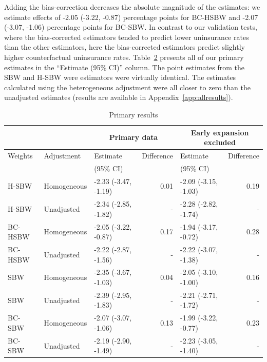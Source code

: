 \documentclass[aoas]{imsart}
\theoremstyle{plain}
\theoremstyle{remark}
\begin{document}
Adding the bias-correction decreases the absolute magnitude of the estimates: we estimate effects of -2.05 (-3.22, -0.87) percentage points for BC-HSBW and -2.07 (-3.07, -1.06) percentage points for BC-SBW. In contrast to our validation tests, where the bias-corrected estimators tended to predict lower uninsurance rates than the other estimators, here the bias-corrected estimators predict slightly higher counterfactual uninsurance rates. Table~\ref{tab:mainresults} presents all of our primary estimates in the ``Estimate (95\% CI)'' column. The point estimates from the SBW and H-SBW were estimators were virtually identical. The estimates calculated using the heterogeneous adjustment were all closer to zero than the unadjusted estimates (results are available in Appendix~\ref{app:allresults}).

\begin{table}[ht]
\begin{longtable}{lllrlr}\caption{Primary results}\label{tab:mainresults}
 \hline
 &  & \multicolumn{2}{c}{Primary data} & \multicolumn{2}{c}{Early expansion 
 excluded} \\
  \hline
Weights & Adjustment & Estimate  & Difference & Estimate & Difference\\ 
 &  & (95\% CI) &  & (95\% CI) & \\
  \hline
H-SBW & Homogeneous & -2.33 (-3.47, -1.19) & 0.01 & -2.09 (-3.15, -1.03) & 0.19 \\ 
  H-SBW & Unadjusted & -2.34 (-2.85, -1.82) & - & -2.28 (-2.82, -1.74) & - \\ 
  BC-HSBW & Homogeneous & -2.05 (-3.22, -0.87) & 0.17 & -1.94 (-3.17, -0.72) & 0.28 \\ 
  BC-HSBW & Unadjusted & -2.22 (-2.87, -1.56) & - & -2.22 (-3.07, -1.38) & - \\ 
  SBW & Homogeneous & -2.35 (-3.67, -1.03) & 0.04 & -2.05 (-3.10, -1.00) & 0.16 \\ 
  SBW & Unadjusted & -2.39 (-2.95, -1.83) & - & -2.21 (-2.71, -1.72) & - \\ 
  BC-SBW & Homogeneous & -2.07 (-3.07, -1.06) & 0.13 & -1.99 (-3.22, -0.77) & 0.23 \\ 
  BC-SBW & Unadjusted & -2.19 (-2.90, -1.49) & - & -2.23 (-3.05, -1.40) & - \\ 
   \hline
\end{longtable}
\end{table}
\end{document}
